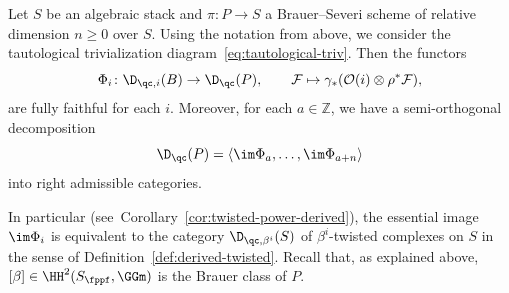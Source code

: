\begin{theorem}
  \label{t:sod-brauer-severi}
  Let $S$ be an algebraic stack and $\pi\colon P \to S$ a
  Brauer--Severi scheme of relative dimension $n \geq 0$ over $S$.
  Using the notation from above,
  we consider the tautological trivialization diagram~\eqref{eq:tautological-triv}.
  Then the functors 
  \begin{equation}
  \label{eq:BS-full-faithful}
  \Phi_i \colon \D_{\qc, i}(B) \to \D_{\qc}(P), \qquad
  \mathcal{F} \mapsto \gamma_*(\mathcal{O}(i)\otimes \rho^*\mathcal{F}),
  \end{equation}
  are fully faithful for each $i$.
  Moreover, for each $a \in \mathbb{Z}$,
  we have a semi-orthogonal decomposition
  \begin{equation}
  \label{eq:BS-sod}
  \D_\qc(P) = \langle \im \Phi_a, \ldots, \im \Phi_{a + n} \rangle
  \end{equation}
  into right admissible categories.
\end{theorem}
\begin{remark}
  \label{r:image-twisted}
  In particular (see~Corollary~\ref{cor:twisted-power-derived}),
  the essential image $\im \Phi_i$ is equivalent to the
  category $\D_{\qc, \beta^i}(S)$ of
  $\beta^i$-twisted complexes on $S$ 
  in the sense of Definition~\ref{def:derived-twisted}.
  Recall that, as explained above,
  $[\beta] \in \HH^2(S_\fppf, \GGm)$ is the Brauer class of $P$.
\end{remark}

